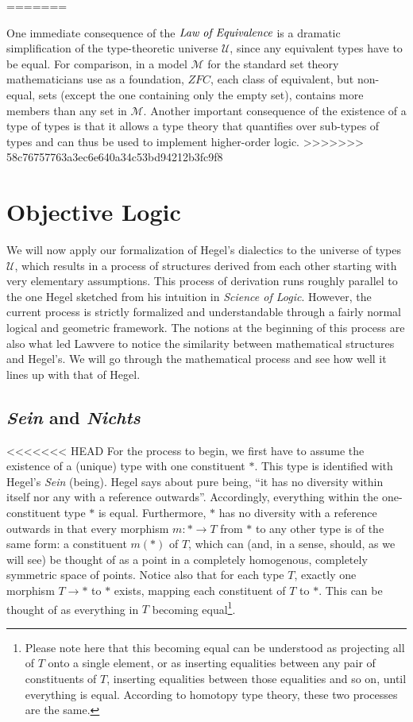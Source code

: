 \documentclass{article}
\begin{document}
=======

One immediate consequence of the $\emph{Law of Equivalence}$ is a dramatic simplification of the type-theoretic
universe $\mathcal{U}$, since any equivalent types have to be equal. For comparison, in a model $\mathcal{M}$
for the standard set theory mathematicians use as a foundation, $ZFC$, each class of equivalent, but non-equal,
sets (except the one containing only the empty set), contains more members than any set in $\mathcal{M}$.
Another important consequence of the existence of a type of types is that it allows a type theory that
quantifies over sub-types of types and can thus be used to implement higher-order logic. 
>>>>>>> 58c76757763a3ec6e640a34c53bd94212b3fc9f8


\section{Objective Logic}
We will now apply our formalization of Hegel's dialectics to the universe of types $\mathcal{U}$, which
results in a process of structures derived from each other starting with very elementary assumptions. This
process of derivation runs roughly parallel to the one Hegel sketched from his intuition in \emph{Science of
Logic}. However, the current process is strictly formalized and understandable through a fairly normal
logical and geometric framework. The notions at the beginning of this process are also what led Lawvere to
notice the similarity between mathematical structures and Hegel's. We will go through the mathematical
process and see how well it lines up with that of Hegel.


\subsection{\emph{Sein} and \emph{Nichts}}
<<<<<<< HEAD
For the process to begin, we first have to assume the existence of a (unique) type with one constituent $*$.
This type is identified with Hegel's \emph{Sein} (being). Hegel says about pure being, ``it has no diversity
within itself nor any with a reference outwards''. Accordingly, everything within the one-constituent type
$*$ is equal. Furthermore, $*$ has no diversity with a reference outwards in that every morphism
$m:*\rightarrow T$ from $*$ to any other type is of the same form: a constituent $m(*)$ of $T$, which can
(and, in a sense, should, as we will see) be thought of as a point in a completely homogenous, completely
symmetric space of points. Notice also that for each type $T$, exactly one morphism $T\rightarrow *$ to $*$
exists, mapping each constituent of $T$ to $*$. This can be thought of as everything in $T$ becoming
equal\footnote{Please note here that this becoming equal can be understood as projecting all of $T$ onto a 
single element, or as inserting equalities between any pair of constituents of $T$, inserting equalities 
between those equalities and so on, until everything is equal. According to homotopy type theory, these two 
processes are the same.}. \\ 
\end{document}

